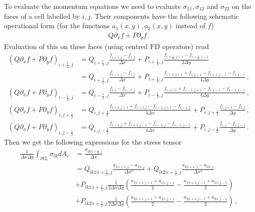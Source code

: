 \documentclass[11pt,a4paper]{article}
\newcommand{\p}{\partial}
\begin{document}
To evaluate the momentum equations we need to evaluate $\sigma_{11}, \sigma_{12}$ and $\sigma_{22}$ on the faces of a cell labelled by $i,j$. Their components have the following schematic operational form (for the functions $a_1(x,y), a_2(x,y)$ instead of $f$)
\begin{align*}
    Q \p_x f + P \p_y f
    \,.
\end{align*}
Evaluation of this on these faces (using centred FD operators) read
\begin{align*}
    \left( Q \p_x f + P \p_y f \right)_{i+\frac{1}{2},j}
    & = 
    Q_{i+\frac{1}{2},j} \frac{f_{i+1,j} - f_{i,j}}{\Delta x}
    + P_{i+\frac{1}{2},j} \frac{f_{i+\frac{1}{2},j+1} - f_{i+\frac{1}{2},j-1}}{2 \Delta y}
    \\
    & = Q_{i+\frac{1}{2},j} \frac{f_{i+1,j}-f_{i,j}}{\Delta x}
    + P_{i+\frac{1}{2},j} \frac{f_{i+1,j+1}+f_{i,j+1}-f_{i+1,j-1}-f_{i,j-1}}{4 \Delta y}
    \,,
    \\
    \left( Q \p_x f + P \p_y f \right)_{i-\frac{1}{2},j}
    & = Q_{i-\frac{1}{2},j} \frac{f_{i,j}-f_{i-1,j}}{\Delta x}
    + P_{i-\frac{1}{2},j} \frac{f_{i,j+1}+f_{i-1,j+1}-f_{i,j-1}-f_{i-1,j-1}}{4 \Delta y}
    \,,
    \\
    \left( Q \p_x f + P \p_y f \right)_{i,j+\frac{1}{2}}
    & = Q_{i,j+\frac{1}{2}} \frac{f_{i+1,j+1}+f_{i+1,j}-f_{i-1,j+1}-f_{i-1,j}}{4 \Delta x}
    + P_{i,j+\frac{1}{2}} \frac{f_{i,j+1}-f_{i,j}}{\Delta y}
    \,,
    \\
    \left( Q \p_x f + P \p_y f \right)_{i,j-\frac{1}{2}}
    & = Q_{i,j-\frac{1}{2}} \frac{f_{i+1,j}+f_{i+1,j-1}-f_{i-1,j}-f_{i-1,j-1}}{4 \Delta x}
    + P_{i,j-\frac{1}{2}} \frac{f_{i,j}-f_{i,j-1}}{\Delta y}
    \,.
\end{align*}
Then we get the following expressions for the stress tensor
\begin{align*}
    \frac{1}{\Delta x \Delta y} \int_{\partial \Omega_e} \sigma_{lk} dA_e
    & = 
    \frac{\sigma_{lk|i+\frac{1}{2},j}}{\Delta x}
    \\
    & = 
    Q_{lk1|i+\frac{1}{2},j} \frac{a_{1|i+1,j}-a_{1|i,j}}{\Delta x^2}
    +
    Q_{lk2|i+\frac{1}{2},j} \frac{a_{2|i+1,j}-a_{2|i,j}}{\Delta x^2}
    \\
    & + 
    P_{lk1|i+\frac{1}{2},j} \frac{1}{2\Delta x \Delta y} 
    \left(
        \frac{a_{1|i+1,j+1}+a_{1|i,j+1}}{2}
        - \frac{a_{1|i+1,j-1}+a_{1|i,j-1}}{2}
    \right)
    \\
    & + 
    P_{lk2|i+\frac{1}{2},j} \frac{1}{2\Delta x \Delta y} 
    \left(
        \frac{a_{2|i+1,j+1}+a_{2|i,j+1}}{2}
        - \frac{a_{2|i+1,j-1}+a_{2|i,j-1}}{2}
    \right)
    \,,
\end{align*}
\end{document}
